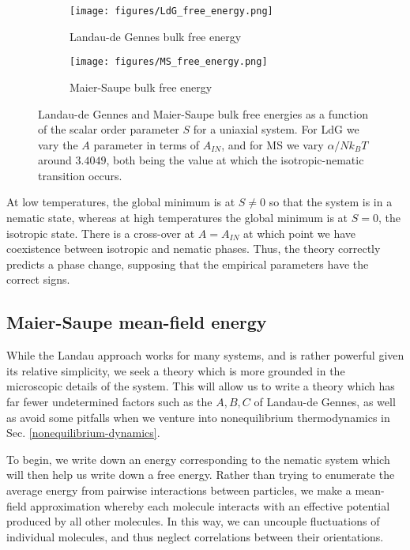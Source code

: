 \documentclass[reqno]{article}
\begin{document}
  \begin{figure}[h]
    \centering
    \begin{subfigure}{0.45\textwidth}
      \texttt{[image: figures/LdG\_free\_energy.png]}
      \caption{Landau-de Gennes bulk free energy}
      \label{fig:ldg-free-energy}
    \end{subfigure}
    \hfill
    \begin{subfigure}{0.45\textwidth}
      \texttt{[image: figures/MS\_free\_energy.png]}
      \caption{Maier-Saupe bulk free energy}
      \label{fig:ms-free-energy}
    \end{subfigure}
    \caption{Landau-de Gennes and Maier-Saupe bulk free energies as a function
      of the scalar order parameter $S$ for a uniaxial system. For LdG we vary
      the $A$ parameter in terms of $A_{IN}$, and for MS we vary $\alpha / N
      k_BT$ around $3.4049$, both being the value at which the
      isotropic-nematic transition occurs.}
  \end{figure}
  At low temperatures, the global minimum is at $S \neq 0$ so that the system is
  in a nematic state, whereas at high temperatures the global minimum is at $S =
  0$, the isotropic state.
  There is a cross-over at $A = A_{IN}$ at which point we have coexistence
  between isotropic and nematic phases.
  Thus, the theory correctly predicts a phase change, supposing that the
  empirical parameters have the correct signs.

  \subsection{Maier-Saupe mean-field energy} \label{maier-saupe-mean-field-energy}
  While the Landau approach works for many systems, and is rather powerful given
  its relative simplicity, we seek a theory which is more grounded in the
  microscopic details of the system.
  This will allow us to write a theory which has far fewer undetermined factors
  such as the $A, B, C$ of Landau-de Gennes, as well as avoid some pitfalls when
  we venture into nonequilibrium thermodynamics in Sec.
  \ref{nonequilibrium-dynamics}.
  
  To begin, we write down an energy corresponding to the nematic system
  which will then help us write down a free energy.
  Rather than trying to enumerate the average energy from pairwise interactions
  between particles, we make a mean-field approximation whereby each molecule
  interacts with an effective potential produced by all other molecules.
  In this way, we can uncouple fluctuations of individual molecules, and thus
  neglect correlations between their orientations.
\end{document}
